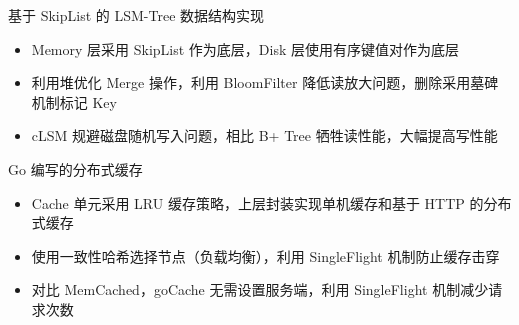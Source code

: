 \documentclass{resume}
\newcommand{\en}[1]{}
\newcommand{\zh}[1]{#1}
\begin{document}
\en{}
\zh{基于 SkipList 的 LSM-Tree 数据结构实现}
\begin{itemize}
      \item \en{}
            \zh{Memory 层采用 SkipList 作为底层，Disk 层使用有序键值对作为底层}
      \item \en{}
            \zh{利用堆优化 Merge 操作，利用 BloomFilter 降低读放大问题，删除采用墓碑机制标记 Key}
      \item \en{}
            \zh{cLSM 规避磁盘随机写入问题，相比 B+ Tree 牺牲读性能，大幅提高写性能}
\end{itemize}




\en{}
\zh{Go 编写的分布式缓存}
\begin{itemize}
      \item \en{}
            \zh{Cache 单元采用 LRU 缓存策略，上层封装实现单机缓存和基于 HTTP 的分布式缓存}
      \item \en{}
            \zh{使用一致性哈希选择节点（负载均衡），利用 SingleFlight 机制防止缓存击穿}
      \item \en{}
            \zh{对比 MemCached，goCache 无需设置服务端，利用 SingleFlight 机制减少请求次数}
\end{itemize}
\end{document}
